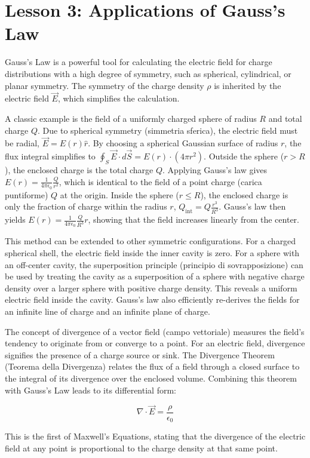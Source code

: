 \section*{Lesson 3: Applications of Gauss's Law}

Gauss's Law is a powerful tool for calculating the electric field for charge distributions with a high degree of symmetry, such as spherical, cylindrical, or planar symmetry. The symmetry of the charge density \(\rho\) is inherited by the electric field \(\vec{E}\), which simplifies the calculation.

A classic example is the field of a uniformly charged sphere of radius \(R\) and total charge \(Q\). Due to spherical symmetry (simmetria sferica), the electric field must be radial, \(\vec{E} = E(r)\hat{r}\). By choosing a spherical Gaussian surface of radius \(r\), the flux integral simplifies to \(\oint_S \vec{E} \cdot d\vec{S} = E(r) \cdot (4\pi r^2)\).
Outside the sphere (\(r > R\)), the enclosed charge is the total charge \(Q\). Applying Gauss's law gives \(E(r) = \frac{1}{4\pi\epsilon_0} \frac{Q}{r^2}\), which is identical to the field of a point charge (carica puntiforme) \(Q\) at the origin.
Inside the sphere (\(r \le R\)), the enclosed charge is only the fraction of charge within the radius \(r\), \(Q_{\text{int}} = Q \frac{r^3}{R^3}\). Gauss's law then yields \(E(r) = \frac{1}{4\pi\epsilon_0} \frac{Q}{R^3} r\), showing that the field increases linearly from the center.

This method can be extended to other symmetric configurations. For a charged spherical shell, the electric field inside the inner cavity is zero. For a sphere with an off-center cavity, the superposition principle (principio di sovrapposizione) can be used by treating the cavity as a superposition of a sphere with negative charge density over a larger sphere with positive charge density. This reveals a uniform electric field inside the cavity. Gauss's law also efficiently re-derives the fields for an infinite line of charge and an infinite plane of charge.

The concept of divergence of a vector field (campo vettoriale) measures the field's tendency to originate from or converge to a point. For an electric field, divergence signifies the presence of a charge source or sink. The Divergence Theorem (Teorema della Divergenza) relates the flux of a field through a closed surface to the integral of its divergence over the enclosed volume. Combining this theorem with Gauss's Law leads to its differential form:

\begin{equation}
    \nabla \cdot \vec{E} = \frac{\rho}{\epsilon_0}
\end{equation}

This is the first of Maxwell's Equations, stating that the divergence of the electric field at any point is proportional to the charge density at that same point.
